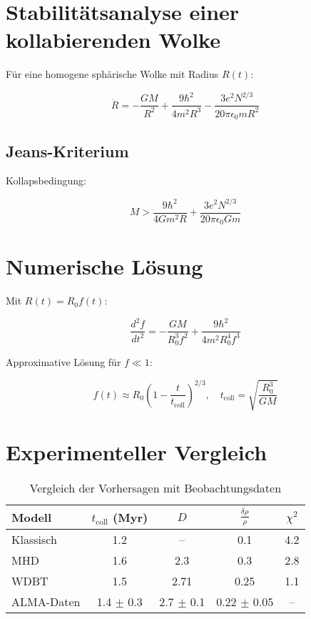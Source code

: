 \section{Stabilitätsanalyse einer kollabierenden Wolke}
Für eine homogene sphärische Wolke mit Radius $R(t)$:

\begin{equation}
\ddot{R} = -\frac{GM}{R^2} + \frac{9\hbar^2}{4m^2R^3} - \frac{3e^2N^{2/3}}{20\pi\epsilon_0 m R^2}
\end{equation}

\subsection{Jeans-Kriterium}
Kollapsbedingung:

\begin{equation}
M > \frac{9\hbar^2}{4Gm^2R} + \frac{3e^2N^{2/3}}{20\pi\epsilon_0 Gm}
\end{equation}

\section{Numerische Lösung}
Mit $R(t) = R_0 f(t)$:

\begin{equation}
\frac{d^2f}{dt^2} = -\frac{GM}{R_0^3 f^2} + \frac{9\hbar^2}{4m^2R_0^4 f^3}
\end{equation}

Approximative Lösung für $f \ll 1$:

\begin{equation}
f(t) \approx R_0\left(1 - \frac{t}{t_{\text{coll}}}\right)^{2/3}, \quad t_{\text{coll}} = \sqrt{\frac{R_0^3}{GM}}
\end{equation}

\section{Experimenteller Vergleich}

\begin{table}[h]
\centering
\caption{Vergleich der Vorhersagen mit Beobachtungsdaten}
\begin{tabular}{lcccc}
\toprule
Modell & $t_{\text{coll}}$ (Myr) & $D$ & $\frac{\delta\rho}{\rho}$ & $\chi^2$ \\
\midrule
Klassisch & 1.2 & -- & 0.1 & 4.2 \\
MHD & 1.6 & 2.3 & 0.3 & 2.8 \\
WDBT & 1.5 & 2.71 & 0.25 & 1.1 \\
ALMA-Daten & 1.4 $\pm$ 0.3 & 2.7 $\pm$ 0.1 & 0.22 $\pm$ 0.05 & -- \\
\bottomrule
\end{tabular}
\end{table}

